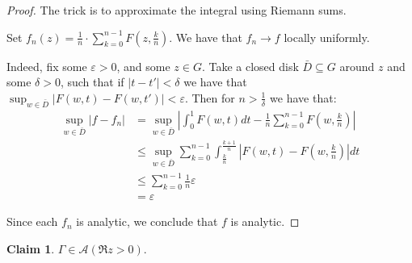 \documentclass[11pt]{article} %
\theoremstyle{definition}
\newtheorem{claim}[theorem]{Claim}
\newcommand{\abs}[1]{\left|#1\right|}
\begin{document}
\begin{proof}
The trick is to approximate the integral using Riemann sums.

Set $f_n \left(z\right) = \frac{1}{n} \cdot \sum_{k=0}^{n-1} F\left(z, \frac{k}{n}\right)$. We have that $f_n \to f$ locally uniformly.

Indeed, fix some $\varepsilon > 0$, and some $z \in G$. Take a closed disk $\bar{D} \subseteq G$ around $z$ and some $\delta > 0$, such that if $\abs{t-t'} < \delta$ we have that $\sup_{w\in\bar{D}}\abs{F\left(w, t\right) - F\left(w, t'\right)} < \varepsilon$. Then for $n > \frac{1}{\delta}$ we have that:
\[
\begin{split}
\sup_{w \in \bar{D}} \abs{f - f_n} & = \sup_{w\in\bar{D}}\abs{\int_0^1 F\left(w,t\right)dt - \frac{1}{n}\sum_{k=0}^{n-1} F\left(w, \frac{k}{n}\right)} \\
& \leq \sup_{w\in\bar{D}}\sum_{k=0}^{n-1}\int_{\frac{k}{n}}^{\frac{k+1}{n}} \abs{F\left(w,t\right) - F\left(w, \frac{k}{n}\right)}dt \\
& \leq \sum_{k=0}^{n-1}\frac{1}{n}\varepsilon \\
& = \varepsilon
\end{split}
\]

Since each $f_n$ is analytic, we conclude that $f$ is analytic.
\end{proof}

\begin{claim}
$\Gamma \in \mathcal{A}\left(\Re z > 0 \right)$.
\end{claim}
\end{document}
